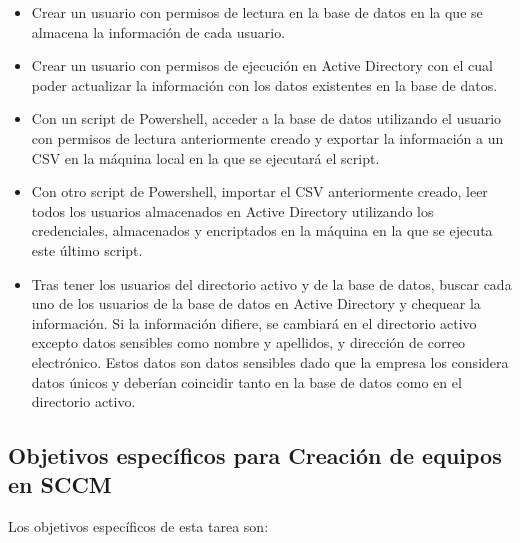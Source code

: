 \documentclass[a4paper, 12pt]{book}
\begin{document}
\begin{itemize}
\item Crear un usuario con permisos de lectura en la base de datos en la que se almacena la información de cada usuario.

\item Crear un usuario con permisos de ejecución en Active Directory con el cual poder actualizar la información con los datos existentes en la base de datos.

\item Con un script de Powershell, acceder a la base de datos utilizando el usuario con permisos de lectura anteriormente creado y exportar la información a un CSV en la máquina local en la que se ejecutará el script.

\item Con otro script de Powershell, importar el CSV anteriormente creado, leer todos los usuarios almacenados en Active Directory utilizando los credenciales, almacenados y encriptados en la máquina en la que se ejecuta este último script.

\item Tras tener los usuarios del directorio activo y de la base de datos, buscar cada uno de los usuarios de la base de datos en Active Directory y chequear la información. Si la información difiere, se cambiará en el directorio activo excepto datos sensibles como nombre y apellidos, y dirección de correo electrónico. Estos datos son datos sensibles dado que la empresa los considera datos únicos y deberían coincidir tanto en la base de datos como en el directorio activo.
\end{itemize}

\subsection{Objetivos específicos para Creación de equipos en SCCM}
\label{Objetivos específicos para Creación de equipos en SCCM}

Los objetivos específicos de esta tarea son:
\end{document}
